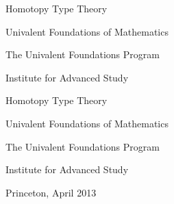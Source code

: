 \pagestyle{empty}
%

%
\vspace*{0.03\textheight}
{\centering
{\color{orange}\fontsize{49}{60}\selectfont%
Homotopy Type Theory}\par
\vspace*{17pt}
{\color{orange}\fontsize{32}{40}\selectfont%
Univalent Foundations of Mathematics}\par}
\vfill
{\centering
{\color{orange}\fontsize{22}{25}\selectfont%
The Univalent Foundations Program\par
\vspace*{8pt}
Institute for Advanced Study}\par}
\vspace*{0.03\textheight}

\cleardoublepage
\setcounter{page}{1}


\vspace*{0.1\textheight}
{\centering
{\fontsize{49}{60}\selectfont%
Homotopy Type Theory}\par
\vspace*{17pt}
{\fontsize{32}{40}\selectfont%
Univalent Foundations of Mathematics}\par
\vspace*{70pt}
{\fontsize{25}{30}\selectfont%
The Univalent Foundations Program\par}}
\vfill
{\centering
{\fontsize{22}{25}\selectfont%
Institute for Advanced Study\par
\vspace*{8pt}
Princeton, April 2013\par}}
\vspace{0.03\textheight}
\hbox{}

\clearpage

%
\hbox{}
\vfill

